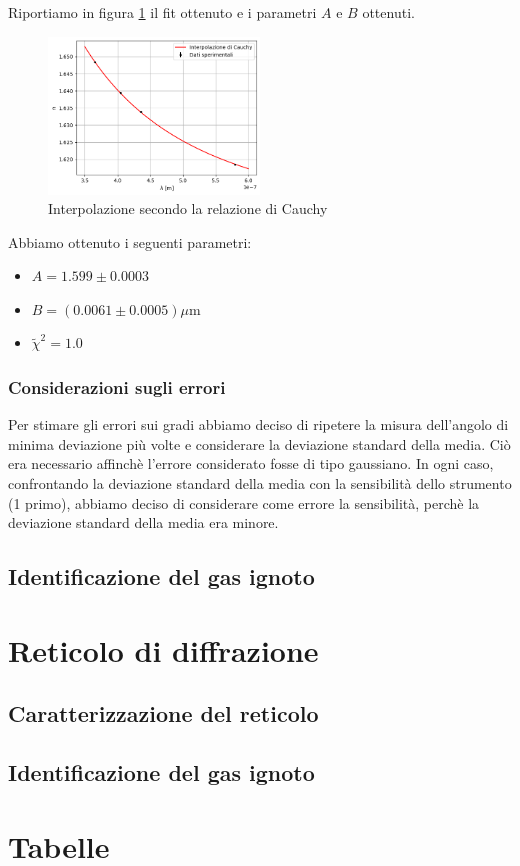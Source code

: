 \documentclass[letterpaper,12pt]{article}
\begin{document}
Riportiamo in figura \ref{fig:Cauchy_fit} il fit ottenuto e i parametri $A$ e $B$ ottenuti.
\begin{figure}[h!]
    \centering
    \includegraphics[width = 0.5\textwidth]{Cauchy_fit.png}
    \caption{Interpolazione secondo la relazione di Cauchy}
    \label{fig:Cauchy_fit}
\end{figure}

Abbiamo ottenuto i seguenti parametri:
\begin{itemize}
    \item $A = 1.599 \pm 0.0003$
    \item $B = (0.0061 \pm 0.0005) \mu$m
    \item $\tilde{\chi}^2 = 1.0$
\end{itemize}

\subsubsection{Considerazioni sugli errori}
Per stimare gli errori sui gradi abbiamo deciso di ripetere la misura dell'angolo di minima deviazione più volte e 
considerare la deviazione standard della media. Ciò era necessario affinchè l'errore considerato fosse di tipo gaussiano. 
In ogni caso, confrontando la deviazione standard della media con la sensibilità dello strumento (1 primo), 
abbiamo deciso di considerare come errore la sensibilità, perchè la deviazione standard della media era minore.

\subsection{Identificazione del gas ignoto}

\section{Reticolo di diffrazione}

\subsection{Caratterizzazione del reticolo}

\subsection{Identificazione del gas ignoto}

\newpage
\section{Tabelle}
\end{document}
